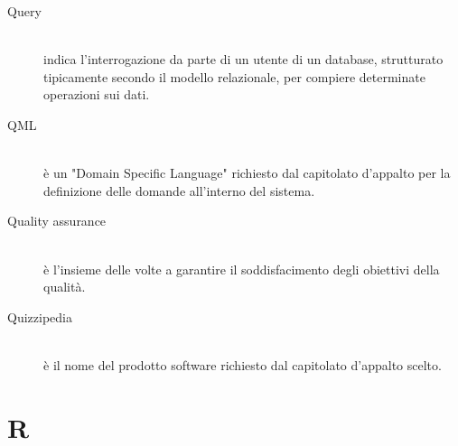 \documentclass[12pt,a4paper]{article}
\begin{document}
\begin{description}
\item[Query] 
\hfill\\indica l'interrogazione da parte di un utente di un database, strutturato tipicamente secondo il modello relazionale, per compiere determinate operazioni sui dati.
\item[QML] 
\hfill\\ è un "Domain Specific Language" richiesto dal capitolato d'appalto per la definizione delle domande all'interno del sistema.

\item[Quality assurance] 
\hfill\\ è l'insieme delle  volte a garantire il soddisfacimento degli obiettivi della qualità.

\item[Quizzipedia] 
\hfill\\ è il nome del prodotto software richiesto dal capitolato d'appalto scelto.
\end{description}

\newpage

\section{R}
\end{document}
